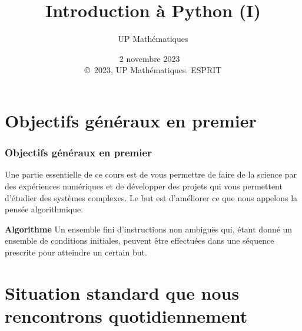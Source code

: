 \documentclass{beamer}
\begin{document}

\newcommand{\exercisesection}[1]{\subsection*{#1}}







\title{Introduction à Python (I)}


\author{UP Mathématiques}

\date{2 novembre 2023
\ \\ 
{\tiny \copyright\ 2023, UP Mathématiques. ESPRIT}
}

\begin{frame}
\titlepage
\end{frame}

\section{Objectifs généraux en premier}

\begin{frame}
\frametitle{Objectifs généraux en premier}


Une partie essentielle de ce cours est de vous permettre de faire de la science par des expériences numériques et de développer des projets qui vous permettent d'étudier des systèmes complexes. Le but est d'améliorer ce que nous appelons la pensée algorithmique.

\noindent\textbf{Algorithme}
Un ensemble fini d'instructions non ambiguës qui, étant donné un ensemble de conditions initiales, peuvent être effectuées dans une séquence prescrite pour atteindre un certain but.


\end{frame}

\section{Situation standard que nous rencontrons quotidiennement}
\end{document}
